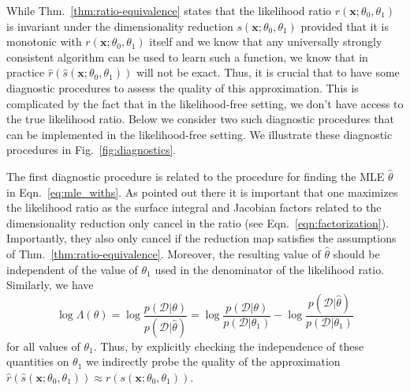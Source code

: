 \documentclass[12pt]{article}
\numberwithin{equation}{section}
\theoremstyle{plain}
\begin{document}
While Thm.~\ref{thm:ratio-equivalence} states that the likelihood ratio $r(\mathbf{x}; \theta_0, \theta_1)$ is
invariant under the dimensionality reduction $s(\mathbf{x}; \theta_0, \theta_1)$ provided that it is monotonic with
$r(\mathbf{x}; \theta_0, \theta_1)$ itself and we know that any universally strongly consistent algorithm can be
used to learn such a function, we know that in practice $\hat{r}(\hat{s}(\mathbf{x}; \theta_0, \theta_1))$ will not be exact.
Thus, it is crucial that to have some diagnostic procedures to assess the quality of this approximation.
This is complicated by the fact that in the likelihood-free setting, we don't have access to the true likelihood ratio.
Below we consider two such diagnostic procedures that can be implemented in the likelihood-free setting. We illustrate these diagnostic procedures in Fig.~\ref{fig:diagnostics}.


The first diagnostic procedure is related to the procedure for finding the MLE $\hat{\theta}$ in Eqn.~\ref{eq:mle_withs}. As pointed out there it is important that one maximizes the likelihood ratio as the surface integral and Jacobian factors related to the dimensionality reduction only cancel in the ratio (see Eqn.~\ref{eqn:factorization}).
Importantly, they also only cancel if the reduction map satisfies the assumptions of Thm.~\ref{thm:ratio-equivalence}. Moreover, the resulting value of $\hat{\theta}$ should be independent of the value of $\theta_1$ used in the denominator of the likelihood ratio. Similarly, we have
\begin{equation}\label{eq:theta_1_independence}
\log\Lambda(\theta) = \log \frac{p(\mathcal{D}|\theta)}{p(\mathcal{D}|\hat\theta)} = \log \frac{p(\mathcal{D}|\theta)}{p(\mathcal{D}|\theta_1)} -\log \frac{p(\mathcal{D}|\hat\theta)}{p(\mathcal{D}|\theta_1)}
\end{equation}
for all values of $\theta_1$. Thus, by explicitly checking the independence of these quantities on $\theta_1$ we indirectly probe the quality of the approximation $\hat{r}(\hat{s}(\mathbf{x}; \theta_0, \theta_1)) \approx {r}({s}(\mathbf{x}; \theta_0, \theta_1))$.
\end{document}
